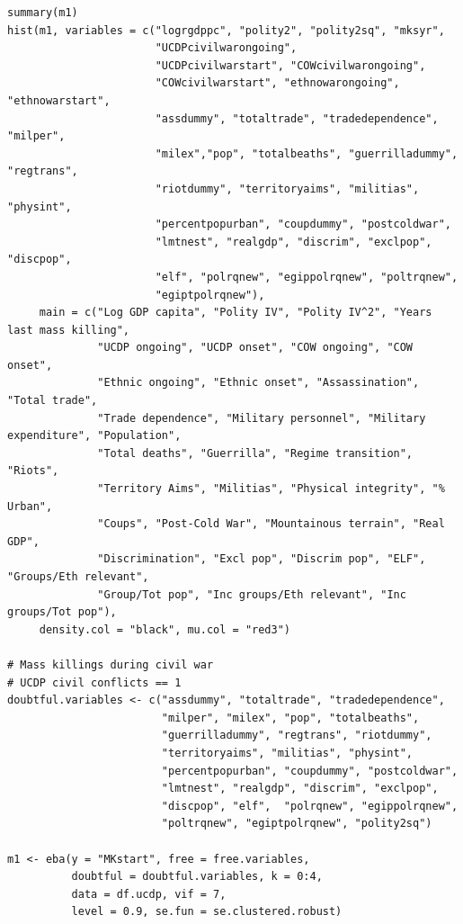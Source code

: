 \begin{verbatim}
summary(m1)
hist(m1, variables = c("logrgdppc", "polity2", "polity2sq", "mksyr",
                       "UCDPcivilwarongoing",
                       "UCDPcivilwarstart", "COWcivilwarongoing",
                       "COWcivilwarstart", "ethnowarongoing", "ethnowarstart",
                       "assdummy", "totaltrade", "tradedependence", "milper",
                       "milex","pop", "totalbeaths", "guerrilladummy", "regtrans",
                       "riotdummy", "territoryaims", "militias", "physint",
                       "percentpopurban", "coupdummy", "postcoldwar",
                       "lmtnest", "realgdp", "discrim", "exclpop", "discpop",
                       "elf", "polrqnew", "egippolrqnew", "poltrqnew",
                       "egiptpolrqnew"),
     main = c("Log GDP capita", "Polity IV", "Polity IV^2", "Years last mass killing",
              "UCDP ongoing", "UCDP onset", "COW ongoing", "COW onset", 
              "Ethnic ongoing", "Ethnic onset", "Assassination", "Total trade", 
              "Trade dependence", "Military personnel", "Military expenditure", "Population", 
              "Total deaths", "Guerrilla", "Regime transition", "Riots",
              "Territory Aims", "Militias", "Physical integrity", "% Urban",
              "Coups", "Post-Cold War", "Mountainous terrain", "Real GDP",
              "Discrimination", "Excl pop", "Discrim pop", "ELF", "Groups/Eth relevant", 
              "Group/Tot pop", "Inc groups/Eth relevant", "Inc groups/Tot pop"),
     density.col = "black", mu.col = "red3")
          
# Mass killings during civil war
# UCDP civil conflicts == 1
doubtful.variables <- c("assdummy", "totaltrade", "tradedependence",
                        "milper", "milex", "pop", "totalbeaths",
                        "guerrilladummy", "regtrans", "riotdummy",
                        "territoryaims", "militias", "physint",
                        "percentpopurban", "coupdummy", "postcoldwar",
                        "lmtnest", "realgdp", "discrim", "exclpop",
                        "discpop", "elf",  "polrqnew", "egippolrqnew",
                        "poltrqnew", "egiptpolrqnew", "polity2sq")

m1 <- eba(y = "MKstart", free = free.variables,
          doubtful = doubtful.variables, k = 0:4,
          data = df.ucdp, vif = 7,
          level = 0.9, se.fun = se.clustered.robust)
          

\end{verbatim}
